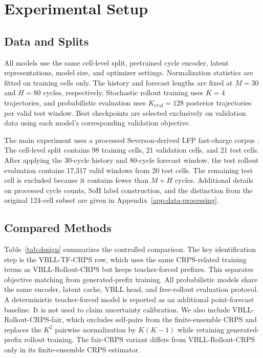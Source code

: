 \documentclass[conference]{IEEEtran}
\begin{document}
\section{Experimental Setup}

\subsection{Data and Splits}

All models use the same cell-level split, pretrained cycle encoder, latent
representations, model size, and optimizer settings. Normalization statistics
are fitted on training cells only. The history and forecast lengths are fixed
at $M=30$ and $H=80$ cycles, respectively. Stochastic rollout training uses
$K=4$ trajectories, and probabilistic evaluation uses $K_{\mathrm{eval}}=128$
posterior trajectories per valid test window. Best checkpoints are selected
exclusively on validation data using each model's corresponding validation
objective.

The main experiment uses a processed Severson-derived LFP fast-charge corpus
\cite{severson2019}. The cell-level split contains 98 training cells, 21
validation cells, and 21 test cells. After applying the 30-cycle history and
80-cycle forecast window, the test rollout evaluation contains 17,317 valid
windows from 20 test cells. The remaining test cell is excluded because it
contains fewer than $M+H$ cycles. Additional details on processed cycle counts, SoH
label construction, and the distinction from the original 124-cell subset are
given in Appendix~\ref{app:data-processing}.

\subsection{Compared Methods}

Table~\ref{tab:design} summarizes the controlled comparison. The key
identification step is the VBLL-TF-CRPS row, which uses the same CRPS-related
training terms as VBLL-Rollout-CRPS but keeps teacher-forced prefixes. This
separates objective matching from generated-prefix training. All probabilistic
models share the same encoder, latent cache, VBLL head, and free-rollout
evaluation protocol. A deterministic teacher-forced model is reported as an
additional point-forecast baseline. It is not used to claim uncertainty
calibration. We also include VBLL-Rollout-CRPS-fair, which excludes self-pairs
from the finite-ensemble CRPS and replaces the $K^2$ pairwise normalization by
$K(K-1)$ while retaining generated-prefix rollout training. The fair-CRPS
variant differs from
VBLL-Rollout-CRPS only in its finite-ensemble CRPS estimator.
\end{document}
